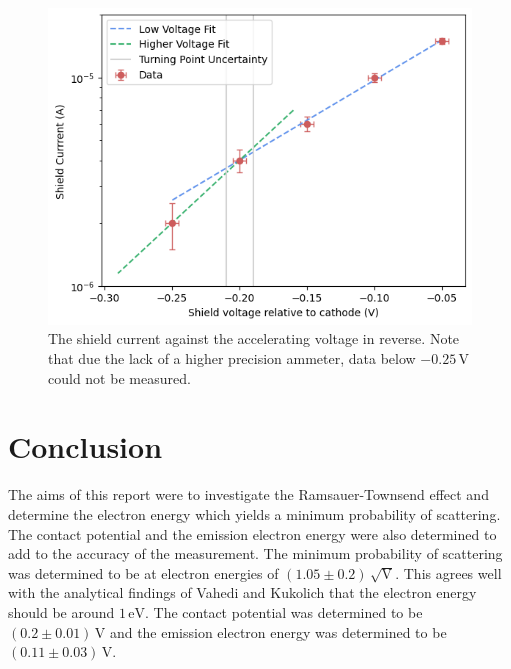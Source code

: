 \documentclass[%
reprint,
amsmath,amssymb,
aps,
floatfix
]{revtex4-2}
\begin{document}
	\begin{figure}
		\includegraphics[width=\columnwidth]{kneeGraph.png}
		\caption{\label{fig:kneeGraph}The shield current against the accelerating voltage in reverse. Note that due the lack of a higher precision ammeter, data below $-0.25 \,\text{V}$ could not be measured.}
	\end{figure}
	
	\section{Conclusion}
	The aims of this report were to investigate the Ramsauer-Townsend effect and determine the electron energy which yields a minimum probability of scattering. The contact potential and the emission electron energy were also determined to add to the accuracy of the measurement. The minimum probability of scattering was determined to be at electron energies of $(1.05 \pm 0.2) \,\sqrt{\text{V}}$. This agrees well with the analytical findings of Vahedi \cite{vahedi} and Kukolich \citep{kukolich} that the electron energy should be around $1 \,\text{eV}$. The contact potential was determined to be $(0.2 \pm 0.01) \,\text{V}$ and the emission electron energy was determined to be $(0.11 \pm 0.03) \,\text{V}$.
		
		
	\clearpage
	
	\clearpage
	\onecolumngrid
	\appendix
	
\end{document}
